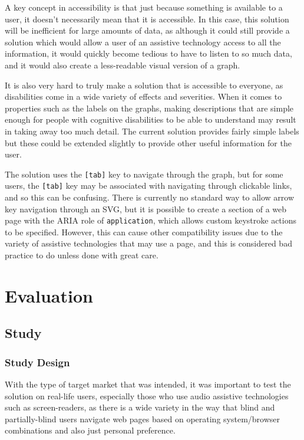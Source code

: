 \documentclass[ %
                    author={Aleena Baig},
                supervisor={Dr Simon Lock},
                    degree={BSc},
                     title={On Making Web Accessible Graphs},
                  subtitle={},
                      year={2019} ]{dissertation}
\begin{document}
A key concept in accessibility is that just because something is available to a user, it doesn't necessarily mean that it is accessible. In this case, this solution will be inefficient for large amounts of data, as although it could still provide a solution which would allow a user of an assistive technology access to all the information, it would quickly become tedious to have to listen to so much data, and it would also create a less-readable visual version of a graph.

It is also very hard to truly make a solution that is accessible to everyone, as disabilities come in a wide variety of effects and severities. When it comes to properties such as the labels on the graphs, making descriptions that are simple enough for people with cognitive disabilities to be able to understand may result in taking away too much detail. The current solution provides fairly simple labels but these could be extended slightly to provide other useful information for the user.

The solution uses the \texttt{[tab]} key to navigate through the graph, but for some users, the \texttt{[tab]} key may be associated with navigating through clickable links, and so this can be confusing. There is currently no standard way to allow arrow key navigation through an SVG, but it is possible to create a section of a web page with the ARIA role of \texttt{application}, which allows custom keystroke actions to be specified. However, this can cause other compatibility issues due to the variety of assistive technologies that may use a page, and this is considered bad practice to do unless done with great care.

\chapter{Evaluation}

\section{Study}

\subsection{Study Design}

With the type of target market that was intended, it was important to test the solution on real-life users, especially those who use audio assistive technologies such as screen-readers, as there is a wide variety in the way that blind and partially-blind users navigate web pages based on operating system/browser combinations and also just personal preference.
\end{document}
